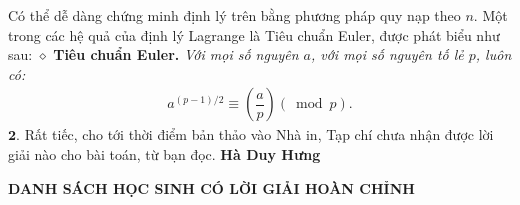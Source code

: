 \begin{multicols}{2}
	\vskip 0.05cm
	Có thể dễ dàng chứng minh định lý trên bằng phương pháp quy nạp theo $n$.
	\vskip 0.05cm
	Một trong các hệ quả của định lý Lagrange là Tiêu chuẩn Euler, được phát biểu như sau:
	\vskip 0.05cm
	$\diamond$ \textbf{\color{thachthuctoanhoc}Tiêu chuẩn Euler.} \textit{Với mọi số nguyên $a$, với mọi số nguyên tố lẻ $p$, luôn có:}
	\begin{align*}
		{a^{\left( {p - 1} \right)/2}} \equiv \left( {\dfrac{a}{p}} \right)\left( {\bmod p} \right).
	\end{align*}
	$\pmb{2.}$ Rất tiếc, cho tới thời điểm bản thảo vào Nhà in, Tạp chí chưa nhận được lời giải nào cho bài toán, từ bạn đọc.
	\vskip 0.05cm
	\hfill	\textbf{\color{thachthuctoanhoc}\color{thachthuctoanhoc}Hà Duy Hưng}
\end{multicols}
\begin{center}
	\textbf{\color{thachthuctoanhoc}DANH SÁCH HỌC SINH CÓ LỜI GIẢI HOÀN CHỈNH}
\end{center}
